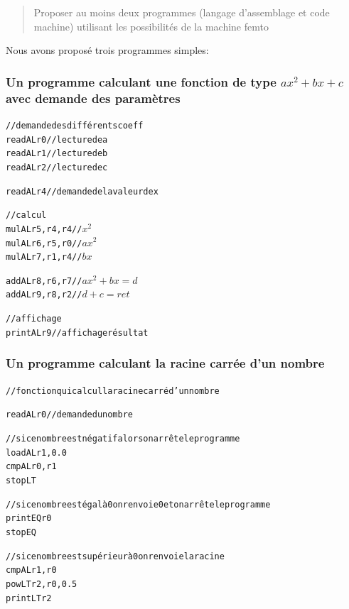 \documentclass[11pt,a4paper]{article}
\begin{document}
\begin{quote}
Proposer au moins deux programmes (langage d’assemblage et code machine) utilisant les possibilités
de la machine femto
\end{quote}

Nous avons proposé trois programmes simples:

\subsubsection*{Un programme calculant une fonction de type $ ax^{2} + bx + c $ avec demande des paramètres}

\begin{alltt}
// demande des différents coeff
readAL r0 //lecture de a
readAL r1 //lecture de b
readAL r2 //lecture de c

readAL r4 // demande de la valeur de x

// calcul
mulAL r5,r4,r4 // \begin{math} x^2 \end{math}
mulAL r6,r5,r0 // \begin{math} ax^2 \end{math}
mulAL r7,r1,r4 // \begin{math} bx \end{math}

addAL r8,r6,r7 // \begin{math} ax^2 + bx = d \end{math}
addAL r9,r8,r2 // \begin{math} d + c = ret \end{math}

//affichage
printAL r9 //affichage résultat
\end{alltt}


\subsubsection*{Un programme calculant la racine carrée d'un nombre}

\begin{alltt}
// fonction qui calcul la racine carré d'un nombre

readAL r0 //demande du nombre

//si ce nombre est négatif alors on arrête le programme
loadAL r1, 0.0
cmpAL r0, r1
stopLT

//si ce nombre est égal à 0 on renvoie 0 et on arrête le programme
printEQ r0
stopEQ

//si ce nombre est supérieur à 0 on renvoie la racine
cmpAL r1, r0
powLT r2,r0, 0.5
printLT r2
\end{alltt}
\end{document}

